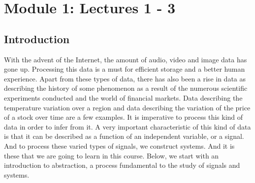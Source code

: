 \section{Module 1: Lectures 1 - 3}
%
%
\subsection{Introduction}
    With the advent of the Internet, the amount of audio, video and image data has gone up. Processing this data is a must for efficient storage and a better human experience. Apart from these types of data, there has also been a rise in data as describing the history of some phenomenon as a result of the numerous scientific experiments conducted and the world of financial markets. Data describing the temperature variation over a region and data describing the variation of the price of a stock over time are a few examples. It is imperative to process this kind of data in order to infer from it. A very important characteristic of this kind of data is that it can be described as a function of an independent variable, or a signal. And to process these varied types of signals, we construct systems. And it is these that we are going to learn in this course. Below, we start with an introduction to abstraction, a process fundamental to the study of signals and systems.
